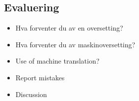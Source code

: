 \documentclass[a4paper,english,12pt]{article}
\begin{document}
\begin{spacing}{1.0}
\section{Evaluering}

 
\begin{itemize}
\item Hva forventer du av en oversetting?  
\item Hva forventer du av maskinoversetting?
\end{itemize}

\begin{itemize}
\item Use of machine translation? 
\item Report mistakes
\item Discussion
\end{itemize}

\end{spacing}
\end{document}
